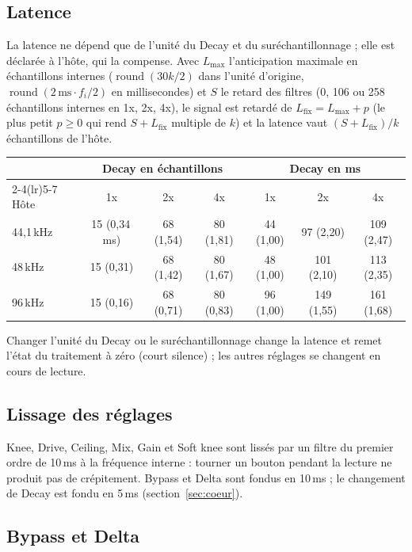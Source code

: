 \documentclass[a4paper,11pt]{article}
\begin{document}
\subsection{Latence}

La latence ne dépend que de l'unité du Decay et du suréchantillonnage ; elle est déclarée à
l'hôte, qui la compense. Avec $L_{\max}$ l'anticipation maximale en échantillons internes
($\operatorname{round}(30k/2)$ dans l'unité d'origine, $\operatorname{round}(2\,\mathrm{ms}\cdot
f_i/2)$ en millisecondes) et $S$ le retard des filtres (0, 106 ou 258 échantillons internes en
1x, 2x, 4x), le signal est retardé de $L_{\mathrm{fix}} = L_{\max} + p$ (le plus petit $p \ge 0$
qui rend $S + L_{\mathrm{fix}}$ multiple de $k$) et la latence vaut $(S + L_{\mathrm{fix}})/k$
échantillons de l'hôte.

\begin{center}
\small
\begin{tabular}{@{}l c c c c c c@{}}
\toprule
 & \multicolumn{3}{c}{Decay en échantillons} & \multicolumn{3}{c}{Decay en ms} \\
\cmidrule(lr){2-4}\cmidrule(lr){5-7}
Hôte & 1x & 2x & 4x & 1x & 2x & 4x \\
\midrule
44,1\,kHz & 15 (0,34\,ms) & 68 (1,54) & 80 (1,81) & 44 (1,00) & 97 (2,20) & 109 (2,47) \\
48\,kHz   & 15 (0,31) & 68 (1,42) & 80 (1,67) & 48 (1,00) & 101 (2,10) & 113 (2,35) \\
96\,kHz   & 15 (0,16) & 68 (0,71) & 80 (0,83) & 96 (1,00) & 149 (1,55) & 161 (1,68) \\
\bottomrule
\end{tabular}
\end{center}
Changer l'unité du Decay ou le suréchantillonnage change la latence et remet l'état du
traitement à zéro (court silence) ; les autres réglages se changent en cours de lecture.

\subsection{Lissage des réglages}

Knee, Drive, Ceiling, Mix, Gain et Soft knee sont lissés par un filtre du premier ordre de
10\,ms à la fréquence interne : tourner un bouton pendant la lecture ne produit pas de
crépitement. Bypass et Delta sont fondus en 10\,ms ; le changement de Decay est fondu en 5\,ms
(section~\ref{sec:coeur}).

\subsection{Bypass et Delta}\label{sec:bypass}
\end{document}
